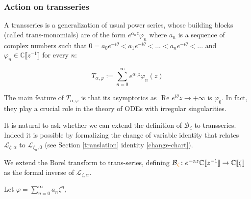 \documentclass{article}
\theoremstyle{definition}
\newcommand{\maps}{\colon}
\newcommand{\C}{\mathbb{C}}
\newcommand{\laplace}{\mathcal{L}}
\newcommand{\borel}{\mathcal{B}}
\theoremstyle{plain}
\begin{document}
\subsubsection{Action on transseries}\label{sec:action_transseries}

A transseries is a generalization of usual power series, whose building blocks (called trans-monomials) are of the form $e^{\alpha_n z}\varphi_n$ where $a_n$ is a sequence of complex numbers such that $0=a_0 e^{-i\theta}< a_1 e^{-i\theta}<...<a_n e^{-i\theta}<...$ and $\varphi_n\in\C\llbracket z^{-1}\rrbracket$ for every $n$: 

\[T_{\alpha,\varphi}:=\sum_{n=0}^{\infty} e^{\alpha_n z} \varphi_n(z) \]

The main feature of $T_{\alpha,\varphi}$ is that its asymptotics as $\text{ Re } e^{i\theta}z \to +\infty$ is $\varphi_0$. In fact, they play a crucial role in the theory of ODEs with irregular singularities. 

It is natural to ask whether we can extend the definition of $\borel_\zeta$ to transseries. Indeed it is possible by formalizing the change of variable identity that relates $\laplace_{\zeta, \alpha}$ to $\laplace_{\zeta_\alpha, 0}$ (see Section \ref{translation} identity \eqref{change-chart}). 

We extend the Borel transform to trans-series, defining $\borel\textcolor{orange}{_\zeta} \maps e^{-\alpha z} \C\llbracket z^{-1} \rrbracket \to \C\llbracket \zeta \rrbracket$ as the formal inverse of $\laplace_{\zeta, \alpha}$.

Let $\varphi=\sum_{n=0}^{\infty}a_n\zeta^n$, %
\end{document}
